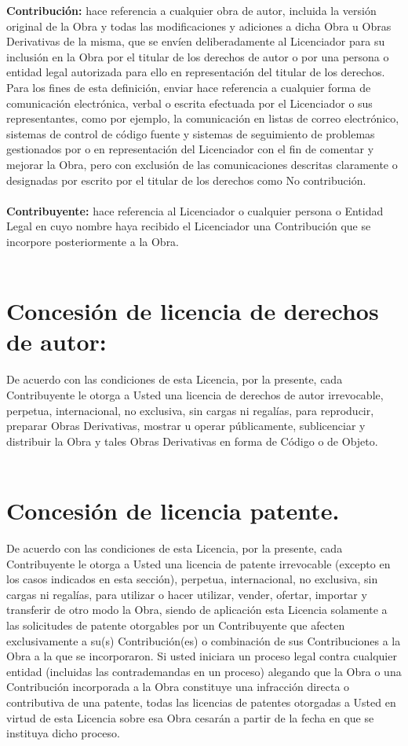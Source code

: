 \textbf{Contribución:} hace referencia a cualquier obra de autor, incluida la versión original de la Obra y todas las modificaciones y adiciones a dicha Obra u Obras Derivativas de la misma, que se envíen deliberadamente al Licenciador para su inclusión en la Obra por el titular de los derechos de autor o por una persona o entidad legal autorizada para ello en representación del titular de los derechos. Para los fines de esta definición, enviar hace referencia a cualquier forma de comunicación electrónica, verbal o escrita efectuada por el Licenciador o sus representantes, como por ejemplo, la comunicación en listas de correo electrónico, sistemas de control de código fuente y sistemas de seguimiento de problemas gestionados por o en representación del Licenciador con el fin de comentar y mejorar la Obra, pero con exclusión de las comunicaciones descritas claramente o designadas por escrito por el titular de los derechos como No contribución.\\\\

\textbf{Contribuyente:} hace referencia al Licenciador o cualquier persona o Entidad Legal en cuyo nombre haya recibido el Licenciador una Contribución que se incorpore posteriormente a la Obra.\\\\

\section{Concesión de licencia de derechos de autor:}De acuerdo con las condiciones de esta Licencia, por la presente, cada Contribuyente le otorga a Usted una licencia de derechos de autor irrevocable, perpetua, internacional, no exclusiva, sin cargas ni regalías, para reproducir, preparar Obras Derivativas, mostrar u operar públicamente, sublicenciar y distribuir la Obra y tales Obras Derivativas en forma de Código o de Objeto.\\\\
\newpage
\section{Concesión de licencia patente.}De acuerdo con las condiciones de esta Licencia, por la presente, cada Contribuyente le otorga a Usted una licencia de patente irrevocable (excepto en los casos indicados en esta sección), perpetua, internacional, no exclusiva, sin cargas ni regalías, para utilizar o hacer utilizar, vender, ofertar, importar y transferir de otro modo la Obra, siendo de aplicación esta Licencia solamente a las solicitudes de patente otorgables por un Contribuyente que afecten exclusivamente a su(s) Contribución(es) o combinación de sus Contribuciones a la Obra a la que se incorporaron. Si usted iniciara un proceso legal contra cualquier entidad (incluidas las contrademandas en un proceso) alegando que la Obra o una Contribución incorporada a la Obra constituye una infracción directa o contributiva de una patente, todas las licencias de patentes otorgadas a Usted en virtud de esta Licencia sobre esa Obra cesarán a partir de la fecha en que se instituya dicho proceso.\\\\
